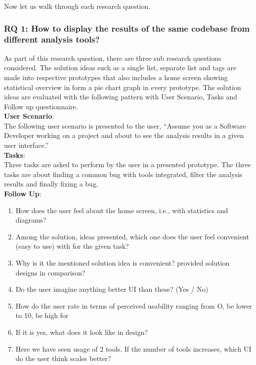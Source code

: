 Now let us walk through each research question. \\


\subsubsection{RQ 1: How to display the results of the same codebase from different analysis tools?}

As part of this research question, there are three sub research questions considered. The solution ideas such as a single list, separate list and tags are made into respective prototypes that also includes a home screen showing statistical overview in form a pie chart graph in every prototype. The solution ideas are evaluated with the following pattern with User Scenario, Tasks and Follow up questionnaire. \\

\textbf{User Scenario}: \\

The following user scenario is presented to the user, “Assume you as a Software Developer working on a project and about to see the analysis results in a given user interface.” \\

\textbf{Tasks}: \\

Three tasks are asked to perform by the user in a presented prototype. The three tasks are about finding a common bug with tools integrated, filter the analysis results and finally fixing a bug. \\

\textbf{Follow Up}: \\

\begin{enumerate}
\item How does the user feel about the home screen, i.e., with statistics and diagrams? 
\item Among the solution, ideas presented, which one does the user feel convenient (easy to use) with for the given task?
\item Why is it the mentioned solution idea is convenient? provided solution designs in comparison?
\item Do the user imagine anything better UI than these? (Yes / No)
\item How do the user rate in terms of perceived usability ranging from O, be lower to 10, be high for
\item If it is yes, what does it look like in design?
\item Here we have seen usage of 2 tools. If the number of tools increases, which UI do the user think scales better? \\
\end{enumerate}


